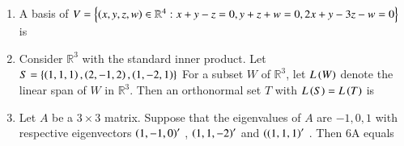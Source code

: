 \documentclass[journal]{IEEEtran}
\begin{document}
\begin{enumerate}
\item A basis of $V = \left\{\left(x, y, z, w\right) \in \mathbb{R}^4: x+y-z=0, y+z+w=0, 2x+y-3z-w=0\right\}$ is
\begin{enumerate}
\end{enumerate}
\item Consider $\mathbb{R}^{3}$ with the standard inner product. Let $ S=\left\{\left(1,1,1\right), \left(2,-1,2\right), \left(1,-2,1\right)\right\}$ For a subset $W$ of $\mathbb{R}^{3}$, let $L\left(W\right)$ denote the linear span of $W$ in $\mathbb{R}^{3}$. Then an orthonormal set $T$ with $L\left(S\right)=L\left(T\right)$ is  
\begin{enumerate}
\end{enumerate}
\item Let $A$ be a $3\times3$ matrix. Suppose that the eigenvalues of $A$ are $-1, 0, 1$ with respective eigenvectors $\left(1, -1, 0\right)^{\prime}$ , $\left(1, 1, -2\right)^{\prime}$ and $\left((1, 1, 1\right)^{\prime}$ . Then 6A equals
\begin{enumerate}
\end{enumerate}
\end{enumerate}
\end{document}
